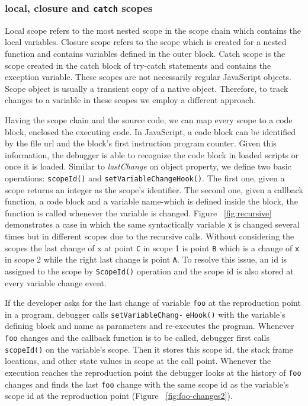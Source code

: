 \documentclass[runningheads,a4paper]{llncs}
\begin{document}
\subsubsection{local, closure and \texttt{catch} scopes}
Local scope refers to the most nested scope in the scope
chain which contains the local variables. Closure scope refers to the 
scope which is created for a nested function and contains variables 
defined in the outer block. Catch scope is the scope created in the catch
block of try-catch statements and contains the exception
variable. These scopes are not necessarily regular JavaScript
objects. Scope object is usually a transient copy of a native object. 
Therefore, to track changes to a variable in these scopes we
employ a different approach.


Having the scope chain and the source code, we can map every scope to %
a code block, enclosed the executing code. In
JavaScript, a code block can be identified by the file url and  
the block's first instruction program counter. Given this information, the debugger is
able to recognize the code block in loaded scripts or once it is loaded.
Similar to \textit{lastChange} on object property, we define two basic operations: 
\texttt{scopeId()} and \texttt{setVariableChangeHook()}. The first one, 
given a scope returns an integer as the scope's identifier. The second one, 
given a callback function, a code block and a variable name-which is defined inside the block, the function is called
whenever the variable is changed. Figure ~\ref{fig:recursive} demonstrates a case in which the same syntactically variable
\texttt{x} is changed several times but in different scopes due to the
recursive calls. Without considering the scopes the last change of x
at point \texttt{C} in scope 1 is point \texttt{B} which is a change of \texttt{x} in 
scope 2 while the right last change is point \texttt{A}. To resolve this issue, an id
is assigned to the scope by \texttt{ScopeId()} operation and the scope id is also stored 
at every variable change event.

If the developer asks for the last change of variable \texttt{foo} at the 
reproduction point in a program, debugger calls 
\texttt{setVariableChang-} \texttt{eHook()} with the variable's defining
block and name as parameters and re-executes the
program. Whenever \texttt{foo} changes and the callback function is to
be called, debugger first calls \texttt{scopeId()} on the
variable's scope. Then it stores this scope id, the stack
frame locations, and other state values in scope at the call point.
Whenever the execution reaches the reproduction point the debugger
looks at the history of \texttt{foo} changes and finds the last
\texttt{foo} change with the same scope id as the variable's scope id
at the reproduction point (Figure ~\ref{fig:foo-changes2}). 
\end{document}
